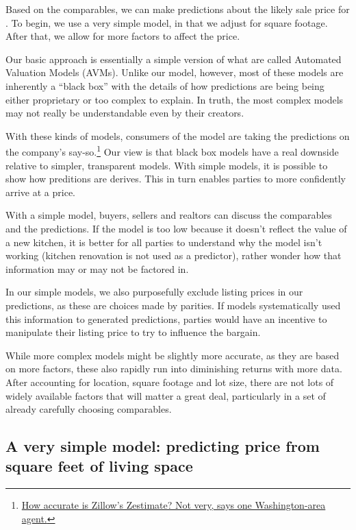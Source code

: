 \documentclass[
12pt, %
letterpaper, %
oneside, %
headinclude,footinclude, %
BCOR5mm, %
]{scrartcl}
\begin{document}
Based on the comparables, we can make predictions about the likely sale price for \PropertyName{}. 
To begin, we use a very simple model, in that we adjust for square footage.
After that, we allow for more factors to affect the price.

Our basic approach is essentially a simple version of what are called Automated Valuation Models (AVMs).
Unlike our model, however, most of these models are inherently a ``black box'' with the details of how predictions are being being either proprietary or too complex to explain.
In truth, the most complex models may not really be understandable even by their creators. 

With these kinds of models, consumers of the model are taking the predictions on the company's say-so.\footnote{\href{https://www.washingtonpost.com/news/where-we-live/wp/2014/06/10/how-accurate-is-zillows-zestimate-not-very-says-one-washington-area-agent/?noredirect=on&utm_term=.e3453c7b3677}{How accurate is Zillow's Zestimate? Not very, says one Washington-area agent.}
}
Our view is that black box models have a real downside relative to simpler, transparent models.
With simple models, it is possible to show how preditions are derives.
This in turn enables parties to more confidently arrive at a price.

With a simple model, buyers, sellers and realtors can discuss the comparables and the predictions.
If the model is too low because it doesn't reflect the value of a new kitchen, it is better for all parties to understand why the model isn't working (kitchen renovation is not used as a predictor), rather wonder how that information may or may not be factored in.

In our simple models, we also purposefully exclude listing prices in our predictions, as these are choices made by parities.
If models systematically used this information to generated predictions, parties would have an incentive to manipulate their listing price to try to influence the bargain. 

While more complex models might be slightly more accurate, as they are based on more factors, these also rapidly run into diminishing returns with more data.
After accounting for location, square footage and lot size, there are not lots of widely available factors that will matter a great deal, particularly in a set of already carefully choosing comparables.

\subsection{A very simple model: predicting price from square feet of living space}
\end{document}
